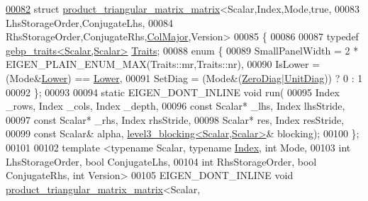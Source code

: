 \begin{DoxyCode}
\hyperlink{struct_eigen_1_1internal_1_1product__triangular__matrix__matrix_3_01_scalar_00_01_index_00_01_mocecf6b0a946de08ae1ae622ae91f7d88}{00082} \textcolor{keyword}{struct }\hyperlink{struct_eigen_1_1internal_1_1product__triangular__matrix__matrix}{product\_triangular\_matrix\_matrix}<Scalar,Index,Mode,true,
00083                                            LhsStorageOrder,ConjugateLhs,
00084                                            RhsStorageOrder,ConjugateRhs,\hyperlink{group__enums_ggaacded1a18ae58b0f554751f6cdf9eb13a0cbd4bdd0abcfc0224c5fcb5e4f6669a}{ColMajor},Version>
00085 \{
00086   
00087   \textcolor{keyword}{typedef} \hyperlink{class_eigen_1_1internal_1_1gebp__traits}{gebp\_traits<Scalar,Scalar>} \hyperlink{class_eigen_1_1internal_1_1gebp__traits}{Traits};
00088   \textcolor{keyword}{enum} \{
00089     SmallPanelWidth   = 2 * EIGEN\_PLAIN\_ENUM\_MAX(Traits::mr,Traits::nr),
00090     IsLower = (Mode&\hyperlink{group__enums_gga39e3366ff5554d731e7dc8bb642f83cda891792b8ed394f7607ab16dd716f60e6}{Lower}) == \hyperlink{group__enums_gga39e3366ff5554d731e7dc8bb642f83cda891792b8ed394f7607ab16dd716f60e6}{Lower},
00091     SetDiag = (Mode&(\hyperlink{group__enums_gga39e3366ff5554d731e7dc8bb642f83cda884ff7240392e85aa6e4b3c957e36483}{ZeroDiag}|\hyperlink{group__enums_gga39e3366ff5554d731e7dc8bb642f83cdaddb72f888ac85d5a1c52333e54f9374b}{UnitDiag})) ? 0 : 1
00092   \};
00093 
00094   \textcolor{keyword}{static} EIGEN\_DONT\_INLINE \textcolor{keywordtype}{void} run(
00095     Index \_rows, Index \_cols, Index \_depth,
00096     \textcolor{keyword}{const} Scalar* \_lhs, Index lhsStride,
00097     \textcolor{keyword}{const} Scalar* \_rhs, Index rhsStride,
00098     Scalar* res,        Index resStride,
00099     \textcolor{keyword}{const} Scalar& alpha, \hyperlink{class_eigen_1_1internal_1_1level3__blocking}{level3\_blocking<Scalar,Scalar>}& blocking);
00100 \};
00101 
00102 \textcolor{keyword}{template} <\textcolor{keyword}{typename} Scalar, \textcolor{keyword}{typename} \hyperlink{namespace_eigen_a62e77e0933482dafde8fe197d9a2cfde}{Index}, \textcolor{keywordtype}{int} Mode,
00103           \textcolor{keywordtype}{int} LhsStorageOrder, \textcolor{keywordtype}{bool} ConjugateLhs,
00104           \textcolor{keywordtype}{int} RhsStorageOrder, \textcolor{keywordtype}{bool} ConjugateRhs, \textcolor{keywordtype}{int} Version>
00105 EIGEN\_DONT\_INLINE \textcolor{keywordtype}{void} \hyperlink{struct_eigen_1_1internal_1_1product__triangular__matrix__matrix}{product\_triangular\_matrix\_matrix}<Scalar,

\end{DoxyCode}

